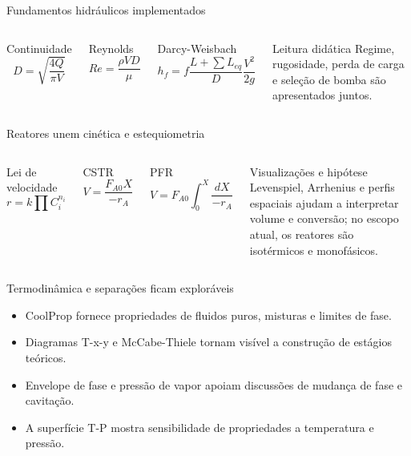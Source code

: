 \begin{frame}{Fundamentos hidráulicos implementados}
  \begin{columns}[T,onlytextwidth]
      \begin{block}{Continuidade}
        \[
          D = \sqrt{\frac{4Q}{\pi V}}
        \]
      \end{block}
      \begin{block}{Reynolds}
        \[
          Re = \frac{\rho V D}{\mu}
        \]
      \end{block}
      \begin{block}{Darcy-Weisbach}
        \[
          h_f = f\frac{L+\sum L_{eq}}{D}\frac{V^2}{2g}
        \]
      \end{block}
      \begin{block}{Leitura didática}
        Regime, rugosidade, perda de carga e seleção de bomba são apresentados juntos.
      \end{block}
  \end{columns}
\end{frame}

\begin{frame}{Reatores unem cinética e estequiometria}
  \begin{columns}[T,onlytextwidth]
      \begin{block}{Lei de velocidade}
        \[
          r = k \prod C_i^{n_i}
        \]
      \end{block}
      \begin{block}{CSTR}
        \[
          V = \frac{F_{A0}X}{-r_A}
        \]
      \end{block}
      \begin{block}{PFR}
        \[
          V = F_{A0}\int_0^X \frac{dX}{-r_A}
        \]
      \end{block}
      \begin{block}{Visualizações e hipótese}
        Levenspiel, Arrhenius e perfis espaciais ajudam a interpretar volume e conversão; no escopo atual, os reatores são isotérmicos e monofásicos.
      \end{block}
  \end{columns}
\end{frame}

\begin{frame}{Termodinâmica e separações ficam exploráveis}
  \begin{itemize}
    \item CoolProp fornece propriedades de fluidos puros, misturas e limites de fase.
    \item Diagramas T-x-y e McCabe-Thiele tornam visível a construção de estágios teóricos.
    \item Envelope de fase e pressão de vapor apoiam discussões de mudança de fase e cavitação.
    \item A superfície T-P mostra sensibilidade de propriedades a temperatura e pressão.
  \end{itemize}
\end{frame}
